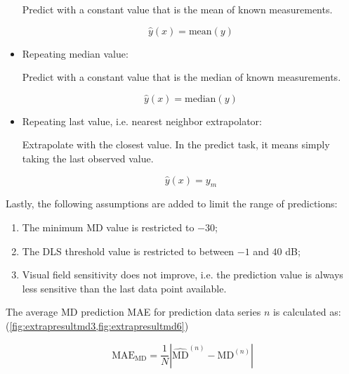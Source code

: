 \begin{itemize}
	Predict with a constant value that is the mean of known measurements.
	
	\begin{equation}
		\hat{y}(x)=\textrm{mean}(y)
	\end{equation}
	
	\item Repeating median value:
	
	Predict with a constant value that is the median of known measurements.
	
	\begin{equation}
	\hat{y}(x)=\textrm{median}(y)
	\end{equation}
	
	\item Repeating last value, i.e. nearest neighbor extrapolator:
	
	Extrapolate with the closest value. In the predict task, it means simply taking the last observed value.
	
	\begin{equation}
		\hat{y}(x)=y_m
	\end{equation}
	
\end{itemize}

Lastly, the following assumptions are added to limit the range of predictions:

\begin{enumerate}
	\item The minimum MD value is restricted to $-30$;
	\item The \ac{DLS} threshold value is restricted to between $-1$ and $40$ dB;
	\item Visual field sensitivity does not improve, i.e. the prediction value is always less sensitive than the last data point available.
\end{enumerate}


The average \ac{MD} prediction \ac{MAE} for prediction data series $n$ is calculated as: (\cref{fig:extrapresultmd3,fig:extrapresultmd6})

\begin{equation}
\textrm{MAE}_{\textrm{MD}} = \frac{1}{N}\left|\widehat{\textrm{MD}}^{(n)}-\textrm{MD}^{(n)} \right|
\end{equation}

